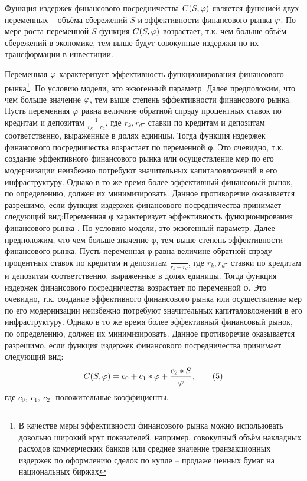 Функция издержек финансового посредничества $C(S,\varphi)$ является функцией двух переменных – объёма сбережений $S$ и эффективности финансового рынка $\varphi$. По мере роста переменной $S$ функция $C(S,\varphi)$ возрастает, т.к. чем больше объём сбережений в экономике, тем выше будут совокупные издержки по их трансформации в инвестиции. 

Переменная $\varphi$ характеризует эффективность функционирования финансового рынка\footnote{В качестве меры эффективности финансового рынка можно использовать довольно широкий круг показателей, например, совокупный объём накладных расходов коммерческих банков или среднее значение транзакционных издержек по оформлению сделок по купле – продаже ценных бумаг на национальных биржах}. По условию модели, это экзогенный параметр. Далее предположим, что чем больше значение $\varphi$, тем выше степень эффективности финансового рынка. Пусть переменная $\varphi$ равна величине обратной спрэду процентных ставок по кредитам и депозитам $\frac{1}{r_k-r_d}$, где $r_k, r_d$- ставки по кредитам и депозитам соответственно, выраженные в долях единицы. Тогда функция издержек финансового посредничества возрастает по переменной φ. Это очевидно, т.к. создание эффективного финансового рынка или осуществление мер по его модернизации неизбежно потребуют значительных капиталовложений в его инфраструктуру. Однако в то же время более эффективный финансовый рынок, по определению, должен их минимизировать. Данное противоречие оказывается разрешимо, если функция издержек финансового посредничества принимает следующий вид:Переменная φ характеризует эффективность функционирования финансового рынка . По условию модели, это экзогенный параметр. Далее предположим, что чем больше значение φ, тем выше степень эффективности финансового рынка. Пусть переменная φ равна величине обратной спрэду процентных ставок по кредитам и депозитам $\frac{1}{r_k-r_d}$, где $r_k,r_d$- ставки по кредитам и депозитам соответственно, выраженные в долях единицы. Тогда функция издержек финансового посредничества возрастает по переменной φ. Это очевидно, т.к. создание эффективного финансового рынка или осуществление мер по его модернизации неизбежно потребуют значительных капиталовложений в его инфраструктуру. Однако в то же время более эффективный финансовый рынок, по определению, должен их минимизировать. Данное противоречие оказывается разрешимо, если функция издержек финансового посредничества принимает следующий вид:
\[C(S,\varphi)=c_0+c_1*\varphi+\frac{c_2*S}{\varphi}, \tag{5}\label{5} \] где $c_0,~c_1,~c_2$- положительные коэффициенты. 

